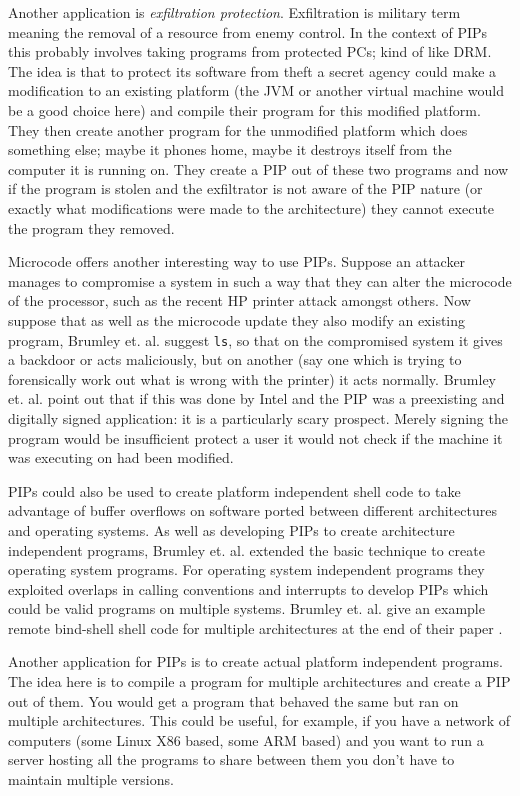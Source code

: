 \documentclass[10pt,]{book}
\begin{document}
Another application is \emph{exfiltration protection}. Exfiltration is
military term meaning the removal of a resource from enemy control. In
the context of PIPs this probably involves taking programs from
protected PCs; kind of like DRM. The idea is that to protect its
software from theft a secret agency could make a modification to an
existing platform (the JVM or another virtual machine would be a good
choice here) and compile their program for this modified platform. They
then create another program for the unmodified platform which does
something else; maybe it phones home, maybe it destroys itself from the
computer it is running on. They create a PIP out of these two programs
and now if the program is stolen and the exfiltrator is not aware of the
PIP nature (or exactly what modifications were made to the architecture)
they cannot execute the program they removed.

Microcode offers another interesting way to use PIPs. Suppose an
attacker manages to compromise a system in such a way that they can
alter the microcode of the processor, such as the recent HP printer
attack amongst others\autocite{Cui:vx}\autocite{Scythale:tk}. Now
suppose that as well as the microcode update they also modify an
existing program, Brumley et. al. suggest \lstinline!ls!, so that on the
compromised system it gives a backdoor or acts maliciously, but on
another (say one which is trying to forensically work out what is wrong
with the printer) it acts normally. Brumley et. al. point
out\autocite{Cha:2010uh} that if this was done by Intel and the PIP was
a preexisting and digitally signed application: it is a particularly
scary prospect. Merely signing the program would be insufficient protect
a user it would not check if the machine it was executing on had been
modified.

PIPs could also be used to create platform independent shell code to
take advantage of buffer overflows on software ported between different
architectures and operating systems. As well as developing PIPs to
create architecture independent programs, Brumley et.
al.\autocite{Cha:2010uh} extended the basic technique to create
operating system programs. For operating system independent programs
they exploited overlaps in calling conventions and interrupts to develop
PIPs which could be valid programs on multiple systems. Brumley et. al.
give an example remote bind-shell shell code for multiple architectures
at the end of their paper \autocite{Cha:2010uh}.

Another application for PIPs is to create actual platform independent
programs. The idea here is to compile a program for multiple
architectures and create a PIP out of them. You would get a program that
behaved the same but ran on multiple architectures. This could be
useful, for example, if you have a network of computers (some Linux X86
based, some ARM based) and you want to run a server hosting all the
programs to share between them you don't have to maintain multiple
versions.
\end{document}
